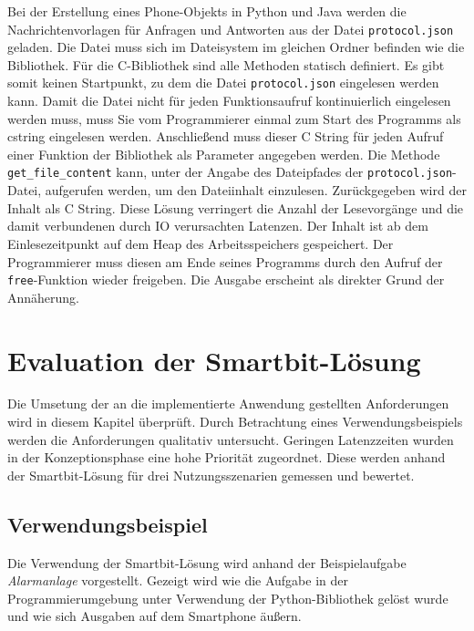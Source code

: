 \documentclass[11pt,a4paper]{report}
\begin{document}
Bei der Erstellung eines Phone-Objekts in Python und Java werden die Nachrichtenvorlagen für Anfragen und Antworten aus der Datei \texttt{protocol.json} geladen.
Die Datei muss sich im Dateisystem im gleichen Ordner befinden wie die Bibliothek.
Für die C-Bibliothek sind alle Methoden statisch definiert.
Es gibt somit keinen Startpunkt, zu dem die Datei \texttt{protocol.json} eingelesen werden kann.
Damit die Datei nicht für jeden Funktionsaufruf kontinuierlich eingelesen werden muss, muss Sie vom Programmierer einmal zum Start des Programms als cstring eingelesen werden.
Anschließend muss dieser C String für jeden Aufruf einer Funktion der Bibliothek als Parameter angegeben werden.
Die Methode \texttt{get\_file\_content} kann, unter der Angabe des Dateipfades der \texttt{protocol.json}-Datei, aufgerufen werden, um den Dateiinhalt einzulesen.
Zurückgegeben wird der Inhalt als C String.
Diese Lösung verringert die Anzahl der Lesevorgänge und die damit verbundenen durch IO verursachten Latenzen.
Der Inhalt ist ab dem Einlesezeitpunkt auf dem Heap des Arbeitsspeichers gespeichert.
Der Programmierer muss diesen am Ende seines Programms durch den Aufruf der \texttt{free}-Funktion wieder freigeben.
Die Ausgabe erscheint als direkter Grund der Annäherung.



\chapter{Evaluation der Smartbit-Lösung}\label{chap:eval}
Die Umsetung der an die implementierte Anwendung gestellten Anforderungen wird in diesem Kapitel überprüft.
Durch Betrachtung eines Verwendungsbeispiels werden die Anforderungen qualitativ untersucht.
Geringen Latenzzeiten wurden in der Konzeptionsphase eine hohe Priorität zugeordnet.
Diese werden anhand der Smartbit-Lösung für drei Nutzungsszenarien gemessen und bewertet.


\section{Verwendungsbeispiel}
Die Verwendung der Smartbit-Lösung wird anhand der Beispielaufgabe \textit{Alarmanlage} vorgestellt.
Gezeigt wird wie die Aufgabe in der Programmierumgebung unter Verwendung der Python-Bibliothek gelöst wurde und wie sich Ausgaben auf dem Smartphone äußern.
\end{document}
